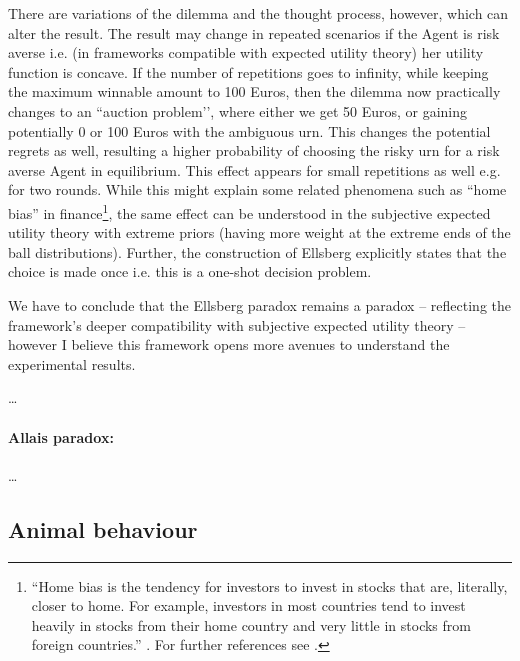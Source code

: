 \documentclass{article}
\begin{document}
There are variations of the dilemma and the thought process, however, which can alter the result.
The result may change in repeated scenarios if the Agent is risk averse i.e. (in frameworks compatible with expected utility theory) her utility function is concave.
If the number of repetitions goes to infinity, while keeping the maximum winnable amount to 100 Euros, then the dilemma now practically changes to an ``auction problem’’, where either we get 50 Euros, or gaining potentially 0 or 100 Euros with the ambiguous urn.
This changes the potential regrets as well, resulting a higher probability of choosing the risky urn for a risk averse Agent in equilibrium. This effect appears for small repetitions as well e.g. for two rounds. While this might explain some related phenomena such as ``home bias'' in finance\footnote{``Home bias is the tendency for investors to invest in stocks that are, literally, closer to home. For example, investors in most countries tend to invest heavily in stocks from their home country and very little in stocks from foreign countries.'' \cite{thesis:NeuralDecisionMaking}. For further references see \cite{paper:HomeBiasDisappearing,paper:HomeBias1991,paper:PuzzlesInMacroeconomics}.}, the same effect can be understood in the subjective expected utility theory with extreme priors (having more weight at the extreme ends of the ball distributions). Further, the construction of Ellsberg explicitly states that the choice is made once i.e. this is a one-shot decision problem.

We have to conclude that the Ellsberg paradox remains a paradox -- reflecting the framework's deeper compatibility with subjective expected utility theory --  however I believe this framework opens more avenues to understand the experimental results.  

\dots


\paragraph{Allais paradox:}
\dots 


\subsection*{Animal behaviour}
\end{document}

